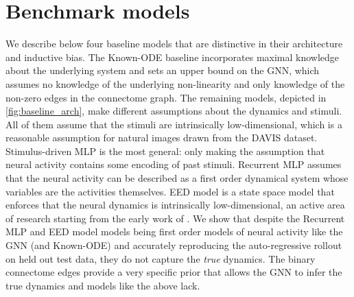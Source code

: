 \documentclass{article}
\def\stimbase{Stimulus-driven MLP}
\def\eedbase{EED model}
\def\mlpbase{Recurrent MLP}
\begin{document}
\section{Benchmark models}
\label{app:benchmark}

We describe below four baseline models that are distinctive in their architecture and inductive bias.
The Known-ODE baseline incorporates maximal knowledge about the underlying system and sets an upper bound on the GNN, which assumes 
no knowledge of the underlying non-linearity and only knowledge of the non-zero edges in the connectome graph. 
The remaining models, depicted in \cref{fig:baseline_arch}, make different assumptions about the dynamics and stimuli. All of them assume that the stimuli are intrinsically low-dimensional, which is a reasonable assumption for natural images drawn from the DAVIS dataset. \stimbase{} is the most general: only making the assumption that neural activity contains some encoding of past stimuli. \mlpbase{} assumes that the neural activity can be described as a first order dynamical system whose variables are the activities themselves. \eedbase{} is a state space model that enforces that the neural dynamics is intrinsically low-dimensional, an active area of research starting from the early work of \citep{churchland_neural_2012, pandarinath_inferring_2018}. We show that despite the \mlpbase{} and \eedbase{} models being first order models of neural activity like the GNN (and Known-ODE) and accurately reproducing the auto-regressive rollout on held out test data, they do not capture the \emph{true} dynamics. The binary connectome edges provide a very specific prior that allows the GNN to infer the true dynamics and models like the above lack.
\end{document}
